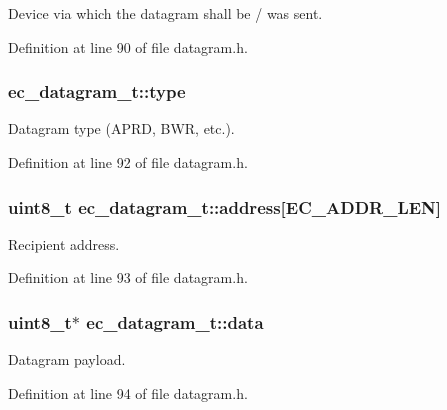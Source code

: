 \-Device via which the datagram shall be / was sent. 



\-Definition at line 90 of file datagram.\-h.

\subsubsection[{type}]{ {\bf ec\-\_\-datagram\-\_\-t\-::type}}\label{structec__datagram__t_a5c19753e2f2a239f3496cde3f9c1ee53}


\-Datagram type (\-A\-P\-R\-D, \-B\-W\-R, etc.). 



\-Definition at line 92 of file datagram.\-h.

\subsubsection[{address}]{\setlength{\rightskip}{0pt plus 5cm}uint8\-\_\-t {\bf ec\-\_\-datagram\-\_\-t\-::address}[{\bf \-E\-C\-\_\-\-A\-D\-D\-R\-\_\-\-L\-E\-N}]}\label{structec__datagram__t_acbe5cfc2b01e0ec6cb720b3dc99c4027}


\-Recipient address. 



\-Definition at line 93 of file datagram.\-h.

\subsubsection[{data}]{\setlength{\rightskip}{0pt plus 5cm}uint8\-\_\-t$\ast$ {\bf ec\-\_\-datagram\-\_\-t\-::data}}\label{structec__datagram__t_ae7471d08444f2bc780532e9268859296}


\-Datagram payload. 



\-Definition at line 94 of file datagram.\-h.

